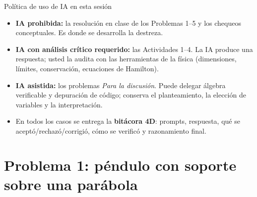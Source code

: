 \documentclass[spanish]{beamer}
\begin{document}
\begin{frame}{Política de uso de IA en esta sesión}
\begin{itemize}
  \item<1-> \textbf{IA prohibida:} la resolución en clase de los Problemas 1--5
        y los chequeos conceptuales. Es donde se desarrolla la destreza.
  \item<2-> \textbf{IA con análisis crítico requerido:} las Actividades 1--4.
        La IA produce una respuesta; usted la audita con las herramientas de la
        física (dimensiones, límites, conservación, ecuaciones de Hamilton).
  \item<3-> \textbf{IA asistida:} los problemas \emph{Para la discusión}. Puede delegar
        álgebra verificable y depuración de código; conserva el planteamiento,
        la elección de variables y la interpretación.
  \item<4-> En todos los casos se entrega la \textbf{bitácora 4D}: prompts, respuesta,
        qué se aceptó/rechazó/corrigió, cómo se verificó y razonamiento final.
\end{itemize}
\end{frame}

\section{Problema 1: péndulo con soporte sobre una parábola}
\end{document}

